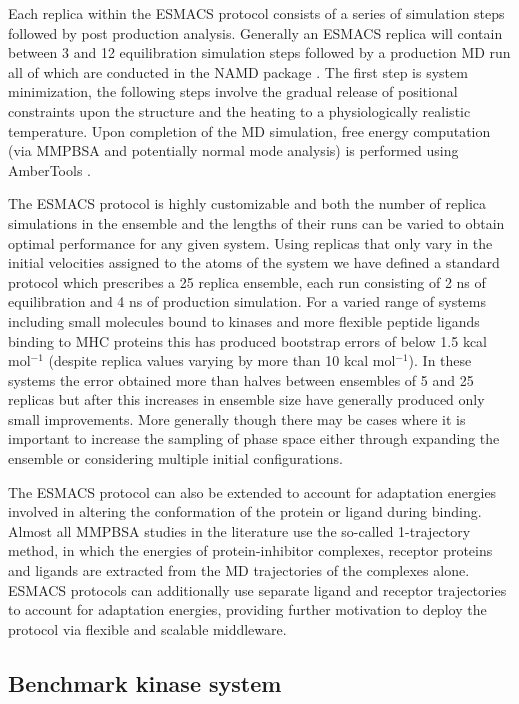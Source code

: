 Each replica within the ESMACS protocol consists of a series of simulation
steps followed by post production analysis. Generally an ESMACS replica will
contain between 3 and 12 equilibration simulation steps followed by a
production MD run all of which are conducted in the NAMD package
\cite{Phillips2005}. The first step is system minimization, the following
steps involve the gradual release of positional constraints upon the structure
and the heating to a physiologically realistic temperature. Upon completion of
the MD simulation, free energy computation (via MMPBSA and potentially normal
mode analysis) is performed using AmberTools \cite{amber14, Case2005,
MillerIII2012}.

The ESMACS protocol is highly customizable and both the number of replica 
simulations in the ensemble and the lengths of their runs can be varied to obtain 
optimal performance for any given system.
Using replicas that only vary in the initial velocities assigned to the atoms of 
the system we have defined a standard protocol which prescribes a 25 replica ensemble, 
each run consisting of 2 ns of equilibration and 4 ns of production simulation.
For a varied range of systems including small molecules bound to kinases and
more flexible peptide ligands binding to MHC proteins this has produced bootstrap 
errors of below 1.5 kcal mol$^{-1}$ (despite replica values varying by more than 10 
kcal mol$^{-1}$). \cite{Wan2015, Wright2014, Wan2017brd4}
In these systems the error obtained more than halves between ensembles of 5 and 25 
replicas but after this increases in ensemble size have generally produced only small 
improvements.
More generally though there may be cases where it is important to 
increase the sampling of phase space either through expanding the ensemble or considering 
multiple initial configurations.

The ESMACS protocol can also be extended to account for adaptation energies involved in 
altering the conformation of the protein or ligand during binding.
Almost all MMPBSA studies in the literature use the so-called
1-trajectory method, in which the energies of protein-inhibitor complexes,
receptor proteins and ligands are extracted from the MD trajectories of the
complexes alone. 
ESMACS protocols can additionally use separate ligand and
receptor trajectories to account for adaptation energies, 
providing further motivation to deploy the protocol via flexible and scalable middleware.

\subsection{Benchmark kinase system}


